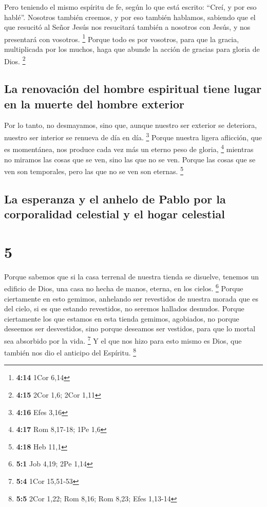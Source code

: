  Pero teniendo el mismo espíritu de fe, según lo que está
escrito: ``Creí, y por eso hablé''. Nosotros también creemos, y por eso
también hablamos,  sabiendo que el que resucitó al Señor
Jesús nos resucitará también a nosotros con Jesús, y nos presentará con
vosotros. \footnote{\textbf{4:14} 1Cor 6,14}  Porque todo
es por vosotros, para que la gracia, multiplicada por los muchos, haga
que abunde la acción de gracias para gloria de Dios. \footnote{\textbf{4:15}
  2Cor 1,6; 2Cor 1,11}

\hypertarget{la-renovaciuxf3n-del-hombre-espiritual-tiene-lugar-en-la-muerte-del-hombre-exterior}{%
\subsection{La renovación del hombre espiritual tiene lugar en la muerte
del hombre
exterior}\label{la-renovaciuxf3n-del-hombre-espiritual-tiene-lugar-en-la-muerte-del-hombre-exterior}}

 Por lo tanto, no desmayamos, sino que, aunque nuestro
ser exterior se deteriora, nuestro ser interior se renueva de día en
día. \footnote{\textbf{4:16} Efes 3,16}  Porque nuestra
ligera aflicción, que es momentánea, nos produce cada vez más un eterno
peso de gloria, \footnote{\textbf{4:17} Rom 8,17-18; 1Pe 1,6}
 mientras no miramos las cosas que se ven, sino las que
no se ven. Porque las cosas que se ven son temporales, pero las que no
se ven son eternas. \footnote{\textbf{4:18} Heb 11,1}

\hypertarget{la-esperanza-y-el-anhelo-de-pablo-por-la-corporalidad-celestial-y-el-hogar-celestial}{%
\subsection{La esperanza y el anhelo de Pablo por la corporalidad
celestial y el hogar
celestial}\label{la-esperanza-y-el-anhelo-de-pablo-por-la-corporalidad-celestial-y-el-hogar-celestial}}

\hypertarget{section-4}{%
\section{5}\label{section-4}}

 Porque sabemos que si la casa terrenal de nuestra tienda
se disuelve, tenemos un edificio de Dios, una casa no hecha de manos,
eterna, en los cielos. \footnote{\textbf{5:1} Job 4,19; 2Pe 1,14}
 Porque ciertamente en esto gemimos, anhelando ser
revestidos de nuestra morada que es del cielo,  si es que
estando revestidos, no seremos hallados desnudos.  Porque
ciertamente los que estamos en esta tienda gemimos, agobiados, no porque
deseemos ser desvestidos, sino porque deseamos ser vestidos, para que lo
mortal sea absorbido por la vida. \footnote{\textbf{5:4} 1Cor 15,51-53}
 Y el que nos hizo para esto mismo es Dios, que también
nos dio el anticipo del Espíritu. \footnote{\textbf{5:5} 2Cor 1,22; Rom
  8,16; Rom 8,23; Efes 1,13-14}


